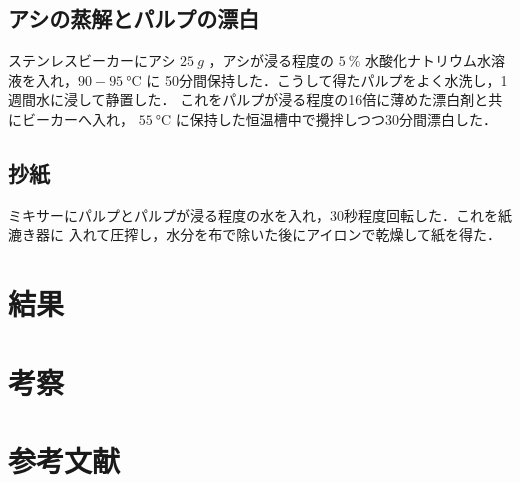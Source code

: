 \documentclass[uplatex, dvipdfmx, 10pt]{jarticle}
\begin{document}
           \subsection*{アシの蒸解とパルプの漂白}
                
                ステンレスビーカーにアシ $\SI{25}{g}$ ，アシが浸る程度の
                $\SI{5}{\%}$ 水酸化ナトリウム水溶液を入れ，$90-\SI{95}{\celsius}$ に
                50分間保持した．こうして得たパルプをよく水洗し，1週間水に浸して静置した．
                これをパルプが浸る程度の16倍に薄めた漂白剤と共にビーカーへ入れ，
                $\SI{55}{\celsius}$ に保持した恒温槽中で攪拌しつつ30分間漂白した．

            \subsection*{抄紙}

                ミキサーにパルプとパルプが浸る程度の水を入れ，30秒程度回転した．これを紙漉き器に
                入れて圧搾し，水分を布で除いた後にアイロンで乾燥して紙を得た．


        \section*{結果}

        \section*{考察}

        \section*{参考文献}

        
    
\end{document}
